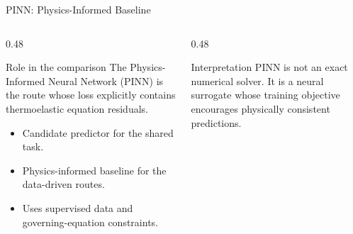 
\begin{frame}{PINN: Physics-Informed Baseline}
  \begin{columns}[T]
    \begin{column}{0.48\textwidth}
      \begin{block}{Role in the comparison}
        \footnotesize
        The Physics-Informed Neural Network (PINN) is the route whose loss
        explicitly contains thermoelastic equation residuals.
      \end{block}
      \begin{itemize}
        \footnotesize
        \item Candidate predictor for the shared task.
        \item Physics-informed baseline for the data-driven routes.
        \item Uses supervised data and governing-equation constraints.
      \end{itemize}
    \end{column}
    \begin{column}{0.48\textwidth}
      \begin{alertblock}{Interpretation}
        \footnotesize
        PINN is not an exact numerical solver. It is a neural surrogate whose
        training objective encourages physically consistent predictions.
      \end{alertblock}
    \end{column}
  \end{columns}
\end{frame}

